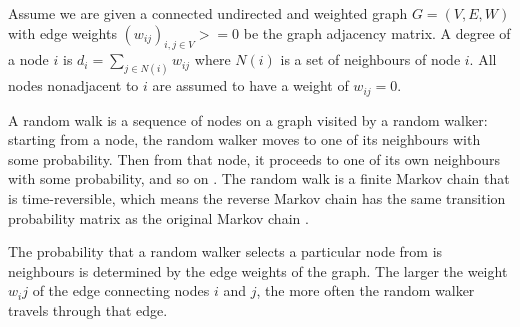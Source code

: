 Assume we are given a connected undirected and weighted graph $G = (V,E,W)$ with
edge weights $(w_{ij})_{i,j \in V} >= 0$ be the graph adjacency matrix. A degree
of a node $i$ is $d_{i} = \sum_{j \in N(i)} w_{ij}$ where $N(i)$ is a set of
neighbours of node $i$. All nodes nonadjacent to $i$ are assumed to have a
weight of $w_{ij} = 0$.

A random walk is a sequence of nodes on a graph visited by a random walker:
starting from a node, the random walker moves to one of its neighbours with some
probability. Then from that node, it proceeds to one of its own neighbours with
some probability, and so on \cite{Khoa:2012}. The random walk is a finite Markov
chain that is time-reversible, which means the reverse Markov chain has the same
transition probability matrix as the original Markov chain \cite{Lovasz:1996}.

The probability that a random walker selects a particular node from is
neighbours is determined by the edge weights of the graph. The larger the weight
${w_ij}$ of the edge connecting nodes $i$ and $j$, the more often the random
walker travels through that edge.
